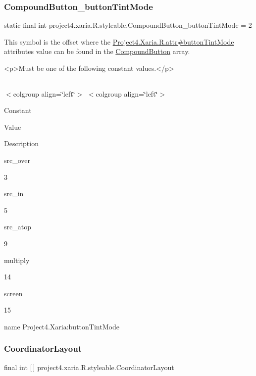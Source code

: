 \subsubsection{\texorpdfstring{Compound\+Button\+\_\+button\+Tint\+Mode}{CompoundButton\_buttonTintMode}}
{\footnotesize\ttfamily static final int project4.\+xaria.\+R.\+styleable.\+Compound\+Button\+\_\+button\+Tint\+Mode = 2\hspace{0.3cm}{\ttfamily [static]}}

This symbol is the offset where the \hyperlink{}{Project4.\+Xaria.\+R.\+attr\#button\+Tint\+Mode} attribute\textquotesingle{}s value can be found in the \hyperlink{classproject4_1_1xaria_1_1R_1_1styleable_a1f5b5d01ec9bc3843c12d8e55c052342}{Compound\+Button} array.

\begin{DoxyVerb}      <p>Must be one of the following constant values.</p>
\end{DoxyVerb}
 \tabulinesep=1mm
\begin{longtabu} spread 0pt [c]{*{0}{|X[-1]}|}
\hline
\end{longtabu}
$<$colgroup align=\char`\"{}left\char`\"{}$>$ $<$colgroup align=\char`\"{}left\char`\"{}$>$ 

Constant

Value

Description 

{\ttfamily src\+\_\+over}

3

{\ttfamily src\+\_\+in}

5

{\ttfamily src\+\_\+atop}

9

{\ttfamily multiply}

14

{\ttfamily screen}

15

name Project4.\+Xaria\+:button\+Tint\+Mode \mbox{\label{classproject4_1_1xaria_1_1R_1_1styleable_abe1865e41984c448731db5ef335746e0}} 
\subsubsection{\texorpdfstring{Coordinator\+Layout}{CoordinatorLayout}}
{\footnotesize\ttfamily final int \mbox{[}$\,$\mbox{]} project4.\+xaria.\+R.\+styleable.\+Coordinator\+Layout\hspace{0.3cm}{\ttfamily [static]}}

